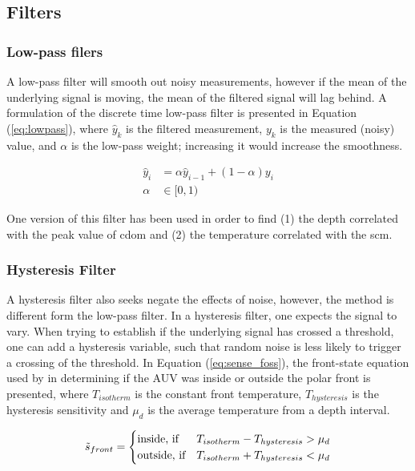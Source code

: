 \subsection{Filters}
\subsubsection*{Low-pass filers}
A low-pass filter will smooth out noisy measurements, however if the mean of the underlying signal is moving, the mean of the filtered signal will lag behind. A formulation of the discrete time low-pass filter is presented in Equation (\ref{eq:lowpass}), where $\hat{y}_k$ is the filtered measurement, $y_k$ is the measured (noisy) value, and $\alpha$ is the low-pass weight; increasing it would increase the smoothness. 

\begin{align}
\label{eq:lowpass}
    \hat{y}_i &= \alpha \hat{y}_{i-1} + (1-\alpha)y_i \\
    \alpha &\in [0,1)
\end{align}

One version of this filter has been used \cite{zhang2011peak,zhang2019autonomous} in order to find (1) the depth correlated with the peak value of \acrshort{cdom} and (2) the temperature correlated with the \acrshort{scm}.

\subsubsection*{Hysteresis Filter}
A hysteresis filter also seeks negate the effects of noise, however, the method is different form the low-pass filter. In a hysteresis filter, one expects the signal to vary. When trying to establish if the underlying signal has crossed a threshold, one can add a hysteresis variable, such that random noise is less likely to trigger a crossing of the threshold. In Equation (\ref{eq:sense_foss}), the front-state equation used by \cite{fossum2021adaptive} in determining if the AUV was inside or outside the polar front is presented, where $T_{isotherm}$ is the constant front temperature, $T_{hysteresis}$ is the hysteresis sensitivity and $\mu_d$ is the average temperature from a depth interval.   

\begin{align}
\label{eq:sense_foss}
    \Tilde{s}_{front} = 
    \begin{cases}
    \text{inside, if} & T_{isotherm} - T_{hysteresis} > \mu_d  \\
    \text{outside, if} & T_{isotherm} + T_{hysteresis} < \mu_d
    \end{cases}
\end{align}

